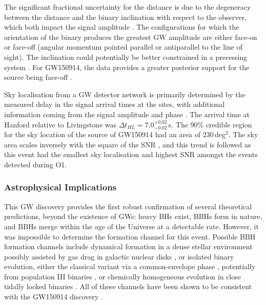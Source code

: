 \documentclass[binding=0.6cm, LaM]{sapthesis}
\begin{document}
	The significant fractional uncertainty for the distance is due to the degeneracy 
	between the distance and the binary inclination with respect to the observer, which both impact the signal amplitude \cite{96, 97, 98}.
	The configurations for which the orientation of the binary produces the greatest GW amplitude 
	are either face-on or face-off (angular momentum pointed parallel or antiparallel to the line of sight). 
	The inclination could potentially be better constrained in a precessing system \cite{94, 95}. 
	For GW150914, the data provides a greater posterior support for the source being face-off \cite{93}.

	Sky localisation from a GW detector network is primarily determined by the measured delay in the signal arrival times at the sites, 
	with additional information coming from the signal amplitude and phase \cite{91,12}. 
	The arrival time at Hanford relative to Livingstone was $\Delta t_{HL} = 7.0^{+0.02}_{-0.02}$\,s.
	The 90\% credible region for the sky location of the source of GW150914 had an area of $230\,$deg$^2$.
	The sky area scales inversely with the square of the SNR \cite{89,90}, 
	and this trend is followed as this event had the smallest sky localisation and 
	highest SNR amongst the events detected during O1.

\subsubsection{Astrophysical Implications}
	This GW discovery provides the first robust confirmation of several theoretical predictions, beyond the existence of GWs:
	heavy BHs exist, BBHs form in nature, and BBHs merge within the age of the Universe at a detectable rate. 
	However, it was impossible to determine the formation channel for this event. 
	Possible BBH formation channels include dynamical formation in a dense stellar environment \cite{84, 88} 
	possibly assisted by gas drag in galactic nuclear disks \cite{82, 83}, or isolated binary evolution, 
	either the classical variant via a common-envelope phase \cite{76, 77, 78, 79, 80, 81}, 
	potentially from population III binaries \cite{74, 75}, or chemically homogeneous evolution 
	in close tidally locked binaries \cite{72, 73}. 
	All of these channels have been shown to be consistent with the GW150914 discovery \cite{63, 64, 65, 66, 67, 68, 69, 70}. 
\end{document}
